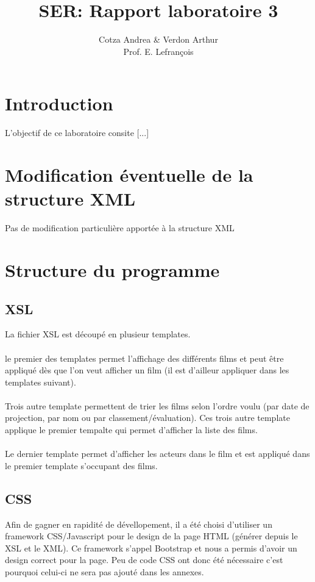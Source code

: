 \documentclass[french]{article}
\begin{document}
	\title{SER: Rapport laboratoire 3}
	\author{Cotza Andrea \& Verdon Arthur\\Prof. E. Lefrançois}
	\maketitle
    \vspace{5cm}
    \tableofcontents
    \newpage

    \section{Introduction}
    L'objectif de ce laboratoire consite [...]

    \section{Modification éventuelle de la structure XML}
    Pas de modification particulière apportée à la structure XML

    \section{Structure du programme}
    \subsection{XSL}
    La fichier XSL est découpé en plusieur templates.
    \\\\le premier des templates permet l'affichage des différents films et peut
    être appliqué dès que l'on veut afficher un film (il est d'ailleur appliquer
    dans les templates suivant).
    \\\\Trois autre template permettent de trier les films
    selon l'ordre voulu (par date de projection, par nom ou par classement/évaluation).
    Ces trois autre template applique le premier tempalte qui permet d'afficher la
    liste des films.
    \\\\Le dernier template permet d'afficher les acteurs dans le film et est appliqué
    dans le premier template s'occupant des films.

    \subsection{CSS}
    Afin de gagner en rapidité de dévellopement, il a été choisi d'utiliser un
    framework CSS/Javascript pour le design de la page HTML (générer depuis le XSL et le XML).
    Ce framework s'appel Bootstrap et nous a permis d'avoir un design correct pour la page.
    Peu de code CSS ont donc été nécessaire c'est pourquoi celui-ci ne sera pas
    ajouté dans les annexes.
\end{document}
